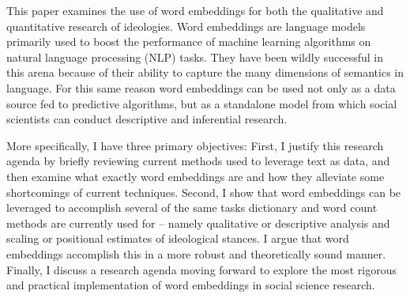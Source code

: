 \documentclass[../embeddings.tex]{subfiles}
\begin{document}
This paper examines the use of word embeddings for both the qualitative and quantitative research of ideologies. Word embeddings are language models primarily used to boost the performance of machine learning algorithms on natural language processing (NLP) tasks. They have been wildly successful in this arena because of their ability to capture the many dimensions of semantics in language. For this same reason word embeddings can be used not only as a data source fed to predictive algorithms, but as a standalone model from which social scientists can conduct descriptive and inferential research. 

More specifically, I have three primary objectives: First, I justify this research agenda by briefly reviewing current methods used to leverage text as data, and then examine what exactly word embeddings are and how they alleviate some shortcomings of current techniques. Second, I show that word embeddings can be leveraged to accomplish several of the same tasks dictionary and word count methods are currently used for – namely qualitative or descriptive analysis and scaling or positional estimates of ideological stances. I argue that word embeddings accomplish this in a more robust and theoretically sound manner. Finally, I discuss a research agenda moving forward to explore the most rigorous and practical implementation of word embeddings in social science research.
\end{document}
